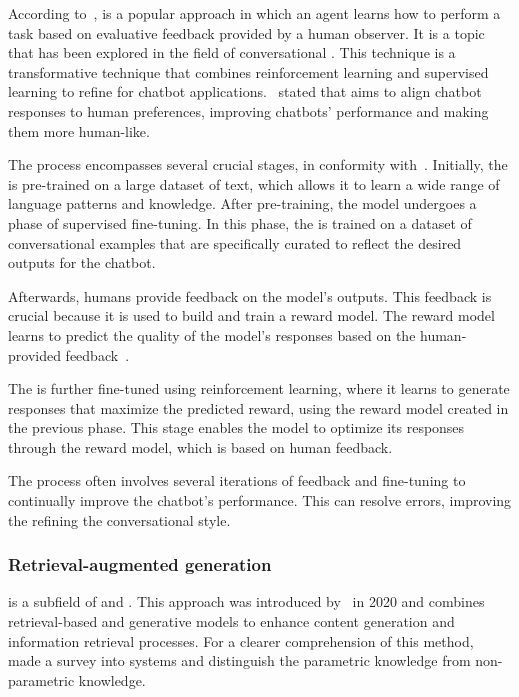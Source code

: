 According to~\citet{li_human-centered_2019}, {\rlhf} is a popular approach in which an agent learns how to perform a task based on evaluative feedback provided by a human observer. It is a topic that has been explored in the field of conversational {\ai}. This technique is a transformative technique that combines reinforcement learning and supervised learning to refine {\llm} for chatbot applications.~\citet{tran_enhancing_2023} stated that {\rlhf} aims to align chatbot responses to human preferences, improving chatbots' performance and making them more human-like.

The process encompasses several crucial stages, in conformity with~\citet{axelsson_modeling_2022}. Initially, the {\llm} is pre-trained on a large dataset of text, which allows it to learn a wide range of language patterns and knowledge. After pre-training, the model undergoes a phase of supervised fine-tuning. In this phase, the {\llm} is trained on a dataset of conversational examples that are specifically curated to reflect the desired outputs for the chatbot. 

Afterwards, humans provide feedback on the model's outputs. This feedback is crucial because it is used to build and train a reward model. The reward model learns to predict the quality of the model's responses based on the human-provided feedback~\cite{axelsson_modeling_2022}.

The {\llm} is further fine-tuned using reinforcement learning, where it learns to generate responses that maximize the predicted reward, using the reward model created in the previous phase. This stage enables the model to optimize its responses through the reward model, which is based on human feedback.

The process often involves several iterations of feedback and fine-tuning to continually improve the chatbot's performance. This can resolve errors, improving the refining the conversational style.



\subsubsection{Retrieval-augmented generation}
\label{rag_section}

{\rag} is a subfield of {\nlp} and {\ai}. This approach was introduced by~\citet{lewis_retrieval-augmented_2020} in 2020 and combines retrieval-based and generative models to enhance content generation and information retrieval processes. For a clearer comprehension of this method,~\citet{gao_retrieval-augmented_2023} made a survey into {\rag} systems and distinguish the parametric knowledge from non-parametric knowledge. 


